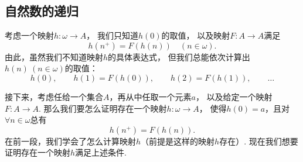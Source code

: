 \subsection{自然数的递归}
考虑一个映射\(h\colon \omega \to A\)，
我们只知道\(h(0)\)的取值，
以及映射\(F\colon A \to A\)满足\[
	h(n^+) = F(h(n))
	\quad(n\in\omega).
\]
由此，虽然我们不知道映射\(h\)的具体表达式，
但我们总能依次计算出\(h(n)\ (n\in\omega)\)的取值：\[
	h(0), \qquad
	h(1) = F(h(0)), \qquad
	h(2) = F(h(1)), \qquad
	\dotsc
\]

接下来，考虑任给一个集合\(A\)，再从中任取一个元素\(a\)，
以及给定一个映射\(F\colon A \to A\).
那么我们要怎么证明存在一个映射\(h\colon \omega \to A\)，
使得\(h(0) = a\)，且对\(\forall n\in\omega\)总有\[
	h(n^+) = F(h(n)).
\]
在前一段，我们学会了怎么计算映射\(h\)（前提是这样的映射\(h\)存在）.
现在我们想要证明存在一个映射\(h\)满足上述条件.

